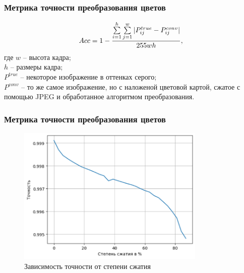 \documentclass[t]{beamer}
\begin{document}
	\begin{frame}
		\frametitle{Метрика точности преобразования цветов}
		\begin{equation}
			Acc = 1 - \frac{\sum\limits_{i=1}^h \sum\limits_{j=1}^w |P^{true}_{ij} - P^{conv}_{ij}|}{255wh},
			\label{eq:flanaccuracy}	
			\vspace*{0.2cm}
		\end{equation}
		где $w$ -- высота кадра;\\ \hfill \break
		$h$ -- размеры кадра;\\ \hfill \break
		$P^{true}$ -- некоторое изображение в оттенках серого;\\ \hfill \break
		$P^{conv}$ -- то же самое изображение, но с наложеной цветовой картой, сжатое с помощью JPEG и обработанное алгоритмом преобразования. 
	\end{frame}

	\begin{frame}
		\frametitle{Метрика точности преобразования цветов}
		\vspace*{-0.35cm}
		\begin{figure}[h!]
			\centering
			\includegraphics[width = 0.8\textwidth]{image/accuracy_plot}	
			\caption{Зависимость точности от степени сжатия}
			\label{fig:fullprepare}
		\end{figure}
	
	\end{frame}
\end{document}
